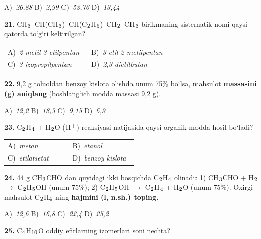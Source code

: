 \documentclass[11pt,a4paper]{article}
\renewcommand{\textsubscript}[1]{\ensuremath{_{\text{\fontsize{8}{8}\selectfont #1}}}}
\renewcommand{\textsuperscript}[1]{\ensuremath{^{\text{\fontsize{8}{8}\selectfont #1}}}}
\begin{document}
\begin{multicols}{2}
\noindent A)~\textsl{26,88} \hfill B)~\textsl{2,99} \hfill C)~\textsl{53,76} \hfill D)~\textsl{13,44}\par
\vspace{4pt}
\noindent\textbf{21.} CH\textsubscript{3}--CH(CH\textsubscript{3})--CH(C\textsubscript{2}H\textsubscript{5})--CH\textsubscript{2}--CH\textsubscript{3} birikmaning sistematik nomi qaysi qatorda to`g`ri keltirilgan?

\noindent\begin{tabular}{@{}p{0.47\linewidth}@{}p{0.47\linewidth}@{}}
A)~\textsl{2-metil-3-etilpentan} & B)~\textsl{3-etil-2-metilpentan} \\
C)~\textsl{3-izopropilpentan} & D)~\textsl{2,3-dietilbutan} \\
\end{tabular}\par
\vspace{4pt}
\noindent\textbf{22.} 9,2 g toluoldan benzoy kislota olishda unum 75\% bo`lsa, mahsulot \textbf{massasini (g) aniqlang} (boshlang`ich modda massasi 9,2 g).

\noindent A)~\textsl{12,2} \hfill B)~\textsl{18,3} \hfill C)~\textsl{9,15} \hfill D)~\textsl{6,9}\par
\vspace{4pt}
\noindent\textbf{23.} C\textsubscript{2}H\textsubscript{4} + H\textsubscript{2}O (H\textsuperscript{+}) reaksiyasi natijasida qaysi organik modda hosil bo`ladi?

\noindent\begin{tabular}{@{}p{0.47\linewidth}@{}p{0.47\linewidth}@{}}
A)~\textsl{metan} & B)~\textsl{etanol} \\
C)~\textsl{etilatsetat} & D)~\textsl{benzoy kislota} \\
\end{tabular}\par
\vspace{4pt}
\noindent\textbf{24.} 44 g CH\textsubscript{3}CHO dan quyidagi ikki bosqichda C\textsubscript{2}H\textsubscript{4} olinadi: 1) CH\textsubscript{3}CHO + H\textsubscript{2} $\to$ C\textsubscript{2}H\textsubscript{5}OH (unum 75\%); 2) C\textsubscript{2}H\textsubscript{5}OH $\to$ C\textsubscript{2}H\textsubscript{4} + H\textsubscript{2}O (unum 75\%). Oxirgi mahsulot C\textsubscript{2}H\textsubscript{4} ning \textbf{hajmini (l, n.sh.) toping.}

\noindent A)~\textsl{12,6} \hfill B)~\textsl{16,8} \hfill C)~\textsl{22,4} \hfill D)~\textsl{25,2}\par
\vspace{4pt}
\noindent\textbf{25.} C\textsubscript{4}H\textsubscript{10}O oddiy efirlarning izomerlari soni nechta?


\end{multicols}
\end{document}
